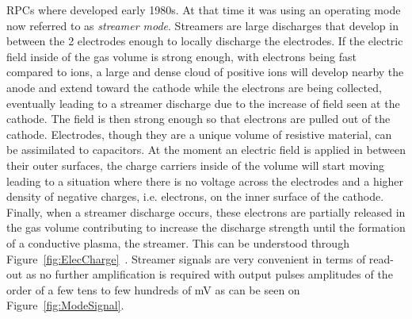 	RPCs where developed early 1980s. At that time it was using an operating mode now referred to as \textit{streamer mode}. Streamers are large discharges that develop in between the 2 electrodes enough to locally discharge the electrodes. If the electric field inside of the gas volume is strong enough, with electrons being fast compared to ions, a large and dense cloud of positive ions will develop nearby the anode and extend toward the cathode while the electrons are being collected, eventually leading to a streamer discharge due to the increase of field seen at the cathode. The field is then strong enough so that electrons are pulled out of the cathode. Electrodes, though they are a unique volume of resistive material, can be assimilated to capacitors. At the moment an electric field is applied in between their outer surfaces, the charge carriers inside of the volume will start moving leading to a situation where there is no voltage across the electrodes and a higher density of negative charges, i.e. electrons, on the inner surface of the cathode. Finally, when a streamer discharge occurs, these electrons are partially released in the gas volume contributing to increase the discharge strength until the formation of a conductive plasma, the streamer. This can be understood through Figure~\ref{fig:ElecCharge}~\cite{CROTTY93}. Streamer signals are very convenient in terms of read-out as no further amplification is required with output pulses amplitudes of the order of a few tens to few hundreds of \si{mV} as can be seen on Figure~\ref{fig:ModeSignal}.
	
